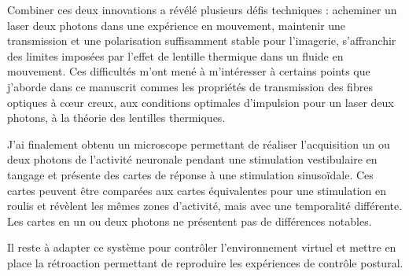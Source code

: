 Combiner ces deux innovations a révélé plusieurs défis techniques : acheminer un laser deux photons dans une expérience en mouvement, maintenir une transmission et une polarisation suffisamment stable pour l'imagerie, s'affranchir des limites imposées par l'effet de lentille thermique dans un fluide en mouvement. Ces difficultés m'ont mené à m'intéresser à certains points que j'aborde dans ce manuscrit commes les propriétés de transmission des fibres optiques à cœur creux, aux conditions optimales d'impulsion pour un laser deux photons, à la théorie des lentilles thermiques. 

J'ai finalement obtenu un microscope permettant de réaliser l'acquisition un ou deux photons de l'activité neuronale pendant une stimulation vestibulaire en tangage et présente des cartes de réponse à une stimulation sinusoïdale. Ces cartes peuvent être comparées aux cartes équivalentes pour une stimulation en roulis et révèlent les mêmes zones d'activité, mais avec une temporalité différente. Les cartes en un ou deux photons ne présentent pas de différences notables.

Il reste à adapter ce système pour contrôler l'environnement virtuel et mettre en place la rétroaction permettant de reproduire les expériences de contrôle postural.